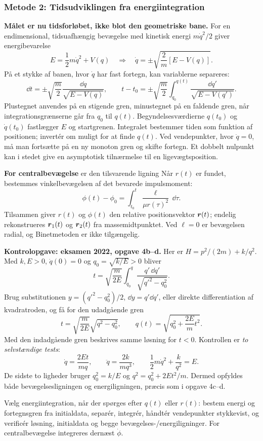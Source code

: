 \subsubsection*{Metode 2: Tidsudviklingen fra energiintegration}
\textbf{Målet er nu tidsforløbet, ikke blot den geometriske bane.} For en endimensional, tidsuafhængig bevægelse med kinetisk energi $m\dot q^2/2$ giver energibevarelse
\[
E=\frac12m\dot q^2+V(q)
\quad\Longrightarrow\quad
\dot q=\pm\sqrt{\frac{2}{m}[E-V(q)]}.
\]
På et stykke af banen, hvor $\dot q$ har fast fortegn, kan variablerne separeres:
\[
\dd t=\pm\sqrt{\frac{m}{2}}\frac{\dd q}{\sqrt{E-V(q)}},
\qquad
\boxed{t-t_0=\pm\sqrt{\frac m2}\int_{q_0}^{q(t)}
\frac{\dd q'}{\sqrt{E-V(q')}}.}
\]
Plustegnet anvendes på en stigende gren, minustegnet på en faldende gren, når integrationsgrænserne går fra $q_0$ til $q(t)$. Begyndelsesværdierne $q(t_0)$ og $\dot q(t_0)$ fastlægger $E$ og startgrenen. Integralet bestemmer tiden som funktion af positionen; invertér om muligt for at finde $q(t)$. Ved vendepunkter, hvor $\dot q=0$, må man fortsætte på en ny monoton gren og skifte fortegn. Et dobbelt nulpunkt kan i stedet give en asymptotisk tilnærmelse til en ligevægtsposition.

\textbf{For centralbevægelse} er den tilsvarende ligning
Når $r(t)$ er fundet, bestemmes vinkelbevægelsen af det bevarede impulsmoment:
\[
\phi(t)-\phi_0=\int_{t_0}^t\frac{\ell}{\mu r(\tau)^2}\,\dd\tau.
\]
Tilsammen giver $r(t)$ og $\phi(t)$ den relative positionsvektor $\boldsymbol{r}(t)$; endelig rekonstrueres $\boldsymbol{r}_1(t)$ og $\boldsymbol{r}_2(t)$ fra massemidtpunktet. Ved $\ell=0$ er bevægelsen radial, og Binetmetoden er ikke tilgængelig.

\textbf{Kontrolopgave: eksamen 2022, opgave 4b--d.} Her er $H=p^2/(2m)+k/q^2$. Med $k,E>0$, $\dot q(0)=0$ og $q_0=\sqrt{k/E}>0$ bliver
\[
t=\sqrt{\frac{m}{2E}}\int_{q_0}^q
\frac{q'\,\dd q'}{\sqrt{q'^2-q_0^2}}.
\]
Brug substitutionen $y=(q'^2-q_0^2)/2$, $\dd y=q'\dd q'$, eller direkte differentiation af kvadratroden, og få for den udadgående gren
\[
t=\sqrt{\frac{m}{2E}}\sqrt{q^2-q_0^2},\qquad
\boxed{q(t)=\sqrt{q_0^2+\frac{2E}{m}t^2}}.
\]
Med den indadgående gren beskrives samme løsning for $t<0$. Kontrollen er \emph{to selvstændige tests}:
\[
\dot q=\frac{2Et}{mq},\qquad
\ddot q=\frac{2k}{mq^3},\qquad
\frac12m\dot q^2+\frac{k}{q^2}=E.
\]
De sidste to ligheder bruger $q_0^2=k/E$ og $q^2=q_0^2+2Et^2/m$. Dermed opfyldes både bevægelsesligningen og energiligningen, præcis som i opgave 4c--d.
\begin{method}Vælg energiintegration, når der spørges efter $q(t)$ eller $r(t)$: bestem energi og fortegnsgren fra initialdata, separér, integrér, håndtér vendepunkter stykkevist, og verificér løsning, initialdata og begge bevægelses-/energiligninger. For centralbevægelse integreres dernæst $\dot\phi$.\end{method}

